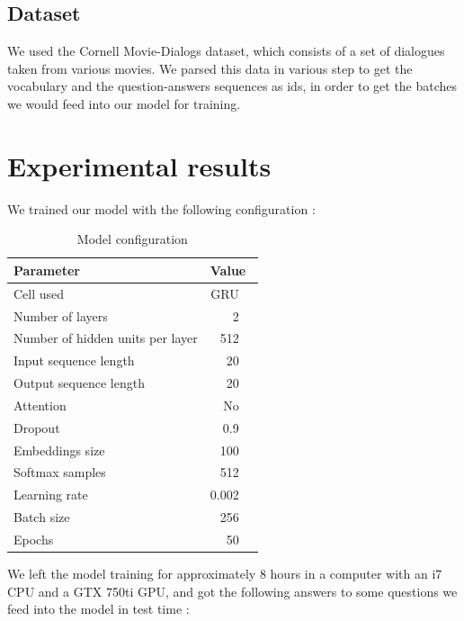 \documentclass{llncs}
\begin{document}
\subsection{Dataset}

We used the Cornell Movie-Dialogs dataset, which consists of a set of dialogues taken from various movies. We parsed this data in various step to get the vocabulary and the question-answers sequences as ids, in order to get the batches we would feed into our model for training.

\section{Experimental results}

We trained our model with the following configuration :

\begin{table}[ht]
\centering
\begin{center}
\begin{tabular}{l@{\quad}rl}
\hline
\multicolumn{1}{l}{\rule{0pt}{12pt}
                   Parameter}&\multicolumn{2}{l}{Value}\\[2pt]
\hline\rule{0pt}{12pt}
Cell used                           &  GRU& \\
Number of layers                    &  2& \\
Number of hidden units per layer    &  512& \\
Input sequence length               &  20& \\
Output sequence length              &  20& \\
Attention                           &  No& \\
Dropout                             &  0.9& \\
Embeddings size                     &  100& \\
Softmax samples                     &  512& \\
Learning rate                       &  0.002& \\
Batch size                          &  256& \\
Epochs                              &  50& \\[2pt]
\hline
\end{tabular}
\caption{Model configuration}
\end{center}
\end{table}

We left the model training for approximately 8 hours in a computer with an i7 CPU and a GTX 750ti GPU, and got the following answers to some questions we feed into the model in test time :
\end{document}

